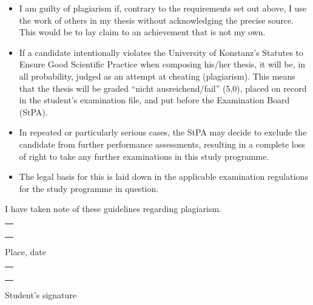 \documentclass[a4paper,10pt,xcolor=dvipsnames]{article}
\begin{document}
\begin{itemize}[label=\color{kon4}---]
\item I am guilty of plagiarism if, contrary to the requirements set out above, I use the work of others in my thesis without acknowledging the precise source. This would be to lay claim to an achievement that is not my own.

\item If a candidate intentionally violates the University of Konstanz's Statutes to Ensure Good Scientific Practice when composing his/her thesis, it will be, in all probability, judged as an attempt at cheating (plagiarism). This means that the thesis will be graded \enquote{nicht ausreichend/fail} (5,0), placed on record in the student's examination file, and put before the Examination Board (StPA).

\item In repeated or particularly serious cases, the StPA may decide to exclude the candidate from further performance assessments, resulting in a complete loss of right to take any further examinations in this study programme.

\item The legal basis for this is laid down in the applicable examination regulations for the study programme in question.
\end{itemize}

I have taken note of these guidelines regarding plagiarism.

\vspace{0.75cm}

\begin{minipage}{0.3\textwidth}
    \begin{tabularx}{\textwidth}{|X|}
        \hline
        \\
        \\
        \\
        \\
        \hline
    \end{tabularx}

    \vspace{0.1cm}

    Place, date
\end{minipage}\begin{minipage}{0.1\textwidth}
     \phantom{a}
\end{minipage}\begin{minipage}{0.6\textwidth}
    \begin{tabularx}{\textwidth}{|X|}
        \hline
        \\
        \\
        \\
        \\
        \hline
    \end{tabularx}

    \vspace{0.1cm}

    \raggedleft Student's signature
\end{minipage}
\end{document}
